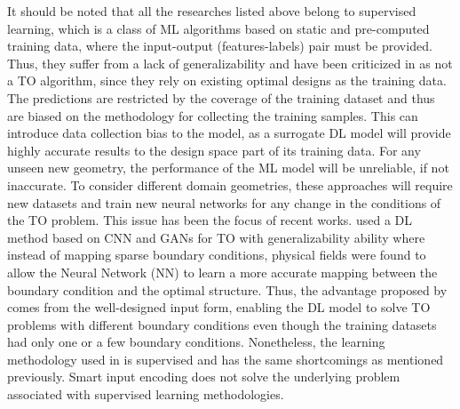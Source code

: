 It should be noted that all the researches listed above belong to supervised learning, which is a class of ML algorithms based on static and pre-computed training data, where the input-output (features-labels) pair must be provided. Thus, they suffer from a lack of generalizability and have been criticized in \cite{deng2020deep} as not a TO algorithm, since they rely on existing optimal designs as the training data. The predictions are restricted by the coverage of the training dataset and thus are biased on the methodology for collecting the training samples. This can introduce data collection bias to the model, as a surrogate DL model will provide highly accurate results to the design space part of its training data. For any unseen new geometry, the performance of the ML model will be unreliable, if not inaccurate. To consider different domain geometries, these approaches will require new datasets and train new neural networks for any change in the conditions of the TO problem. This issue has been the focus of recent works. \parencite{zhang2019deep} used a DL method based on CNN and GANs for TO with generalizability ability where instead of mapping sparse boundary conditions, physical fields were found to allow the Neural Network (NN) to learn a more accurate mapping between the boundary condition and the optimal structure. Thus, the advantage proposed by \cite{zhang2019deep} comes from the well-designed input form, enabling the DL model to solve TO problems with different boundary conditions even though the training datasets had only one or a few boundary conditions. Nonetheless, the learning methodology used in \cite{zhang2019deep} is supervised and has the same shortcomings as mentioned previously. Smart input encoding does not solve the underlying problem associated with supervised learning methodologies.
